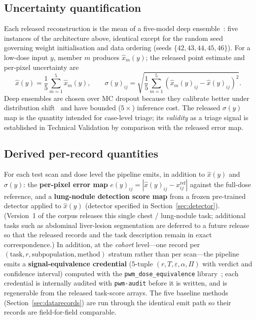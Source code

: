 \documentclass{article}
\begin{document}
\subsection{Uncertainty quantification}
\label{sec:uq}
Each released reconstruction is the mean of a five-model deep
ensemble~\citep{lakshminarayanan2017deep}: five instances of the
architecture above, identical except for the random seed governing weight
initialisation and data ordering (seeds $\{42,43,44,45,46\}$). For a
low-dose input $y$, member $m$ produces $\hat{x}_m(y)$; the released point
estimate and per-pixel uncertainty are
\begin{equation}
    \hat{x}(y) = \frac{1}{5}\sum_{m=1}^{5} \hat{x}_m(y), \qquad
    \sigma(y)_{ij} = \sqrt{\frac{1}{5}\sum_{m=1}^{5}\left(\hat{x}_m(y)_{ij} - \hat{x}(y)_{ij}\right)^2}.
\end{equation}
Deep ensembles are chosen over MC dropout because they calibrate better
under distribution shift~\citep{ovadia2019uncertainty,gal2016dropout} and
have bounded ($5\times$) inference cost. The released $\sigma(y)$ map is
the quantity intended for case-level triage; its \emph{validity} as a
triage signal is established in Technical Validation by comparison with
the released error map.

\subsection{Derived per-record quantities}
For each test scan and dose level the pipeline emits, in addition to
$\hat{x}(y)$ and $\sigma(y)$: the \textbf{per-pixel error map}
$e(y)_{ij} = |\hat{x}(y)_{ij} - x^{\textrm{ref}}_{ij}|$ against the
full-dose reference, and a \textbf{lung-nodule detection score map} from a
frozen pre-trained detector applied to $\hat{x}(y)$
(detector specified in Section~\ref{sec:detector}). (Version~1 of the
corpus releases this single chest / lung-nodule task; additional tasks
such as abdominal liver-lesion segmentation are deferred to a future
release so that the released records and the task description remain in
exact correspondence.) In addition, at the \emph{cohort} level---one record per $(\textrm{task}, r,
\textrm{subpopulation}, \textrm{method})$ stratum rather than per
scan---the pipeline emits a \textbf{signal-equivalence credential}
(5-tuple $(r, T, \varepsilon, \alpha, \Pi)$ with verdict and confidence
interval) computed with the \texttt{pwm\_dose\_equivalence}
library~\citep{ws2framework}; each credential is internally audited with
\texttt{pwm-audit} before it is written, and is regenerable from the
released task-score arrays. The five baseline methods
(Section~\ref{sec:datarecords}) are run through the identical emit path so
their records are field-for-field comparable.
\end{document}
